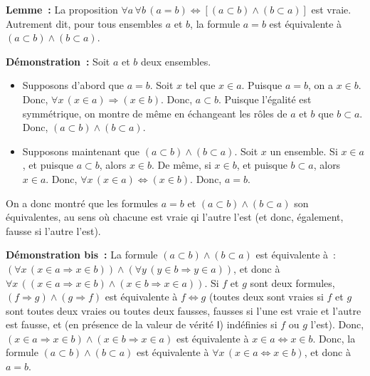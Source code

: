 \done

\medskip

\noindent\textbf{Lemme :} La proposition $\forall a \, \forall b \, (a = b) \Leftrightarrow [(a \subset b) \wedge (b \subset a)]$ est vraie.
    Autrement dit, pour tous ensembles $a$ et $b$, la formule $a = b$ est équivalente à $(a \subset b) \wedge (b \subset a)$.

\medskip

\noindent\textbf{Démonstration :} 
    Soit $a$ et $b$ deux ensembles. 
    \begin{itemize}[nosep]
        \item Supposons d'abord que $a = b$.
            Soit $x$ tel que $x \in a$. 
            Puisque $a = b$, on a $x \in b$. 
            Donc, $\forall x \, (x \in a) \Rightarrow (x \in b)$.
            Donc, $a \subset b$. 
            Puisque l'égalité est symmétrique, on montre de même en échangeant les rôles de $a$ et $b$ que $b \subset a$.
            Donc, $(a \subset b) \wedge (b \subset a)$. 
        \item Supposons maintenant que $(a \subset b) \wedge (b \subset a)$. 
            Soit $x$ un ensemble. 
            Si $x \in a$, et puisque $a \subset b$, alors $x \in b$.
            De même, si $x \in b$, et puisque $b \subset a$, alors $x \in a$.
            Donc, $\forall x \, (x \in a) \Leftrightarrow (x \in b)$. 
            Donc, $a = b$. 
    \end{itemize}
    On a donc montré que les formules $a = b$ et $(a \subset b) \wedge (b \subset a)$ son équivalentes, au sens où chacune est vraie qi l'autre l'est (et donc, également, fausse si l'autre l'est).

   \done 

\medskip

\noindent\textbf{Démonstration bis :} 
    La formule $(a \subset b) \wedge (b \subset a)$ est équivalente à : $(\forall x \, (x \in a \Rightarrow x \in b)) \wedge (\forall y \, (y \in b \Rightarrow y \in a))$, et donc à $\forall x \, ((x \in a \Rightarrow x \in b) \wedge (x \in b \Rightarrow x \in a))$. 
    Si $f$ et $g$ sont deux formules, $(f \Rightarrow g) \wedge (g \Rightarrow f)$ est équivalente à $f \Leftrightarrow g$ (toutes deux sont vraies si $f$ et $g$ sont toutes deux vraies ou toutes deux fausses, fausses si l'une est vraie et l'autre est fausse, et (en présence de la valeur de vérité $\mathsf{I}$) indéfinies si $f$ ou $g$ l'est).
    Donc, $(x \in a \Rightarrow x \in b) \wedge (x \in b \Rightarrow x \in a)$ est équivalente à $x \in a \Leftrightarrow x \in b$.
    Donc, la formule $(a \subset b) \wedge (b \subset a)$ est équivalente à $\forall x \, (x \in a \Leftrightarrow x \in b)$, et donc à $a = b$.

